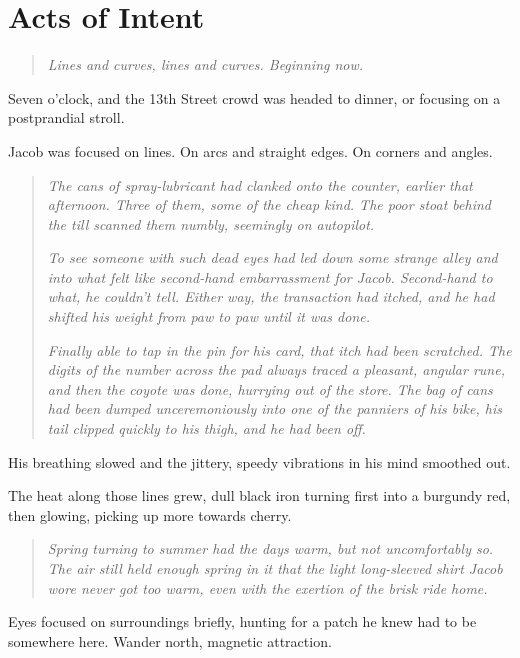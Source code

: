 \hypertarget{acts-of-intent}{%
\chapter{Acts of Intent}\label{acts-of-intent}}

\begin{quote}
\emph{Lines and curves, lines and curves. Beginning now.}
\end{quote}

Seven o'clock, and the 13th Street crowd was headed to dinner, or focusing on a postprandial stroll.

Jacob was focused on lines. On arcs and straight edges. On corners and angles.

\begin{quote}
\emph{The cans of spray-lubricant had clanked onto the counter, earlier that afternoon. Three of them, some of the cheap kind. The poor stoat behind the till scanned them numbly, seemingly on autopilot.}

\emph{To see someone with such dead eyes had led down some strange alley and into what felt like second-hand embarrassment for Jacob. Second-hand to what, he couldn't tell. Either way, the transaction had itched, and he had shifted his weight from paw to paw until it was done.}

\emph{Finally able to tap in the pin for his card, that itch had been scratched. The digits of the number across the pad always traced a pleasant, angular rune, and then the coyote was done, hurrying out of the store. The bag of cans had been dumped unceremoniously into one of the panniers of his bike, his tail clipped quickly to his thigh, and he had been off.}
\end{quote}

His breathing slowed and the jittery, speedy vibrations in his mind smoothed out.

The heat along those lines grew, dull black iron turning first into a burgundy red, then glowing, picking up more towards cherry.

\begin{quote}
\emph{Spring turning to summer had the days warm, but not uncomfortably so. The air still held enough spring in it that the light long-sleeved shirt Jacob wore never got too warm, even with the exertion of the brisk ride home.}
\end{quote}

Eyes focused on surroundings briefly, hunting for a patch he knew had to be somewhere here. Wander north, magnetic attraction.


